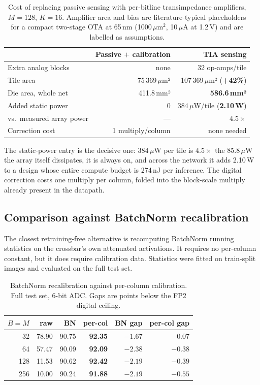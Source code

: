 \documentclass[conference,10pt]{IEEEtran}
\begin{document}
\begin{table}[t]
\centering
\caption{Cost of replacing passive sensing with per-bitline transimpedance
amplifiers, $M{=}128$, $K{=}16$. Amplifier area and bias are
literature-typical placeholders for a compact two-stage OTA at 65\,nm
(1000\,$\mu$m$^2$, 10\,$\mu$A at 1.2\,V) and are labelled as assumptions.}
\label{tab:tia}
\begin{tabular}{lrr}
\toprule
 & Passive $+$ calibration & TIA sensing \\
\midrule
Extra analog blocks & none & 32 op-amps/tile \\
Tile area & 75\,369\,$\mu$m² & 107\,369\,$\mu$m² (\textbf{+42\%}) \\
Die area, whole net & 411.8\,mm² & \textbf{586.6\,mm²} \\
Added static power & 0 & 384\,$\mu$W/tile (\textbf{2.10\,W}) \\
vs.\ measured array power & --- & $4.5\times$ \\
Correction cost & 1 multiply/column & none needed \\
\bottomrule
\end{tabular}
\end{table}

The static-power entry is the decisive one: 384\,$\mu$W per tile is
$4.5\times$ the 85.8\,$\mu$W the array itself dissipates, it is always on, and
across the network it adds 2.10\,W to a design whose entire compute budget is
274\,nJ per inference. The digital correction costs one multiply per column,
folded into the block-scale multiply already present in the datapath.

\subsection{Comparison against BatchNorm recalibration}

The closest retraining-free alternative is recomputing BatchNorm running
statistics on the crossbar's own attenuated activations. It requires no
per-column constant, but it does require calibration data. Statistics were
fitted on train-split images and evaluated on the full test set.

\begin{table}[t]
\centering
\caption{BatchNorm recalibration against per-column calibration. Full test
set, 6-bit ADC. Gaps are points below the FP2 digital ceiling.}
\label{tab:bn}
\begin{tabular}{rrrrrr}
\toprule
$B{=}M$ & raw & BN & \textbf{per-col} & BN gap & \textbf{per-col gap} \\
\midrule
32  & 78.90 & 90.75 & \textbf{92.35} & $-1.67$ & $\mathbf{-0.07}$ \\
64  & 57.47 & 90.09 & \textbf{92.09} & $-2.38$ & $\mathbf{-0.38}$ \\
128 & 11.53 & 90.62 & \textbf{92.42} & $-2.19$ & $\mathbf{-0.39}$ \\
256 & 10.00 & 90.24 & \textbf{91.88} & $-2.19$ & $\mathbf{-0.55}$ \\
\bottomrule
\end{tabular}
\end{table}
\end{document}

